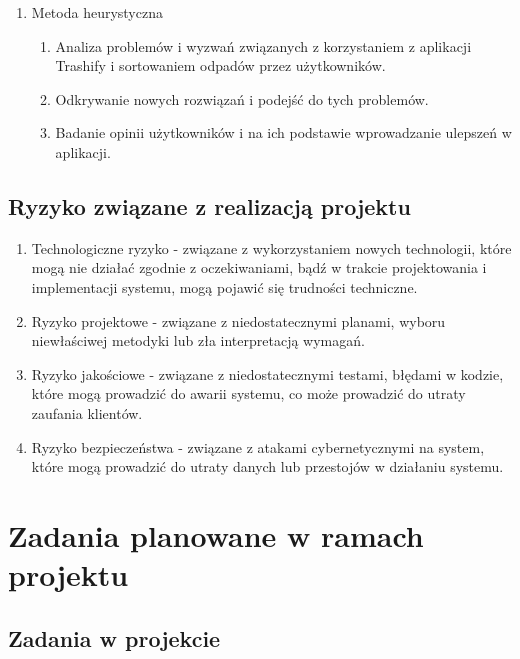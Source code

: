 \documentclass[12pt,oneside]{book}
\begin{document}
\begin{enumerate}
    \item Metoda heurystyczna
    
       
    \begin{enumerate}[label=--]
        \item Analiza problemów i wyzwań związanych z korzystaniem z aplikacji Trashify i sortowaniem odpadów przez użytkowników.
        \item Odkrywanie nowych rozwiązań i podejść do tych problemów.
        \item Badanie opinii użytkowników i na ich podstawie wprowadzanie ulepszeń w aplikacji.
    \end{enumerate}

\end{enumerate}

\section{Ryzyko związane z realizacją projektu}

\begin{enumerate}[label=--]
    \item Technologiczne ryzyko - związane z wykorzystaniem nowych technologii, które mogą nie działać zgodnie z oczekiwaniami, bądź w trakcie projektowania i implementacji systemu, mogą pojawić się trudności techniczne.
    \item Ryzyko projektowe - związane z niedostatecznymi planami, wyboru niewłaściwej metodyki lub zła interpretacją wymagań.
    \item Ryzyko jakościowe - związane z niedostatecznymi testami, błędami w kodzie, które mogą prowadzić do awarii systemu, co może prowadzić do utraty zaufania klientów.
    \item Ryzyko bezpieczeństwa - związane z atakami cybernetycznymi na system, które mogą prowadzić do utraty danych lub przestojów w działaniu systemu.
\end{enumerate}

\newpage

{\let\clearpage\relax\chapter{Zadania planowane w ramach projektu}}

\section{Zadania w projekcie}
\end{document}
